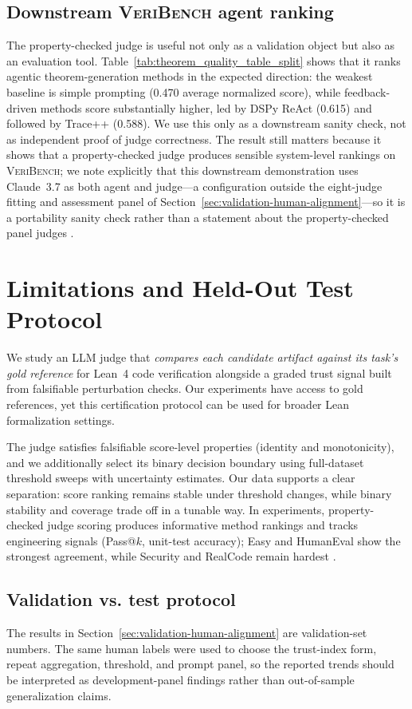 \documentclass{article}
\begin{document}
\subsection{Downstream \textsc{VeriBench} agent ranking}
The property-checked judge is useful not only as a validation object but also as an evaluation tool. Table~\ref{tab:theorem_quality_table_split} shows that it ranks agentic theorem-generation methods in the expected direction: the weakest baseline is simple prompting (0.470 average normalized score), while feedback-driven methods score substantially higher, led by DSPy ReAct (0.615) and followed by Trace++ (0.588). We use this only as a downstream sanity check, not as independent proof of judge correctness. The result still matters because it shows that a property-checked judge produces sensible system-level rankings on \textsc{VeriBench}; we note explicitly that this downstream demonstration uses Claude~3.7 as both agent and judge---a configuration outside the eight-judge fitting and assessment panel of Section~\ref{sec:validation-human-alignment}---so it is a portability sanity check rather than a statement about the property-checked panel judges \citep{khattab2024dspy,cheng2024trace,chen2021evaluating}.

\section{Limitations and Held-Out Test Protocol}
We study an LLM judge that \emph{compares each candidate artifact against its task's gold reference} for Lean~4 code verification alongside a graded trust signal built from falsifiable perturbation checks. Our experiments have access to gold references, yet this certification protocol can be used for broader Lean formalization settings.

The judge satisfies falsifiable score-level properties (identity and monotonicity), and we additionally select its binary decision boundary using full-dataset threshold sweeps with uncertainty estimates.
Our data supports a clear separation: score ranking remains stable under threshold changes, while binary stability and coverage trade off in a tunable way.
In experiments, property-checked judge scoring produces informative method rankings and tracks engineering signals (Pass@$k$, unit-test accuracy); Easy and HumanEval show the strongest agreement, while Security and RealCode remain hardest \citep{chen2021evaluating}.

\subsection{Validation vs. test protocol}\label{sec:val-vs-test}
The results in Section~\ref{sec:validation-human-alignment} are validation-set numbers. The same human labels were used to choose the trust-index form, repeat aggregation, threshold, and prompt panel, so the reported trends should be interpreted as development-panel findings rather than out-of-sample generalization claims.
\end{document}
